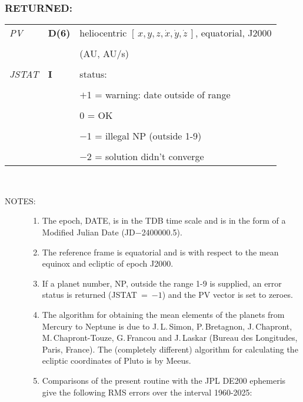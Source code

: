 \documentclass[11pt,twoside,nolof]{starlink}
\providecommand{\xyzxyzd}   {$[\,x,y,z,\dot{x},\dot{y},\dot{z}\,]$}
\newcommand{\args}[2]{
  \subsubsection*{#1:}
     \begin{tabular}{p{7em}p{6em}p{22em}}
       #2
     \end{tabular}\\
}
\newcommand{\spec}[3]
{
  \emph{{#1}} & {\textbf{\mbox{#2}}} & {#3} \\
}
\newcommand{\notes}[1]
 {
   \begin{description}
     \item[NOTES:]
         #1
   \end{description}
}
\begin{document}
\args{RETURNED}
{
 \spec{PV}{D(6)}{heliocentric \xyzxyzd, equatorial, J2000} \\
 \spec{}{}{\hspace{1.5em} (AU, AU/s)} \\
 \spec{JSTAT}{I}{status:} \\
 \spec{}{}{\hspace{1.5em} $+$1 = warning: date outside of range} \\
 \spec{}{}{\hspace{2.3em}    0 = OK} \\
 \spec{}{}{\hspace{1.5em} $-$1 = illegal NP (outside 1-9)} \\
 \spec{}{}{\hspace{1.5em} $-$2 = solution didn't converge}
}
\notes
{
 \begin{enumerate}
  \item The epoch, DATE, is in the TDB time scale and is in the form
        of a Modified Julian Date (JD$-$2400000.5).
  \item The reference frame is equatorial and is with respect to
        the mean equinox and ecliptic of epoch J2000.
  \item If a planet number, NP, outside the range 1-9 is supplied, an error
        status is returned (JSTAT~=~$-1$) and the PV vector
        is set to zeroes.
  \item The algorithm for obtaining the mean elements of the
        planets from Mercury to Neptune is due to
        J.\,L.\,Simon, P.\,Bretagnon, J.\,Chapront,
        M.\,Chapront-Touze, G.\,Francou and J.\,Laskar (Bureau des
        Longitudes, Paris, France).  The (completely different)
        algorithm for calculating the ecliptic coordinates of
        Pluto is by Meeus.
  \item Comparisons of the present routine with the JPL DE200 ephemeris
        give the following RMS errors over the interval 1960-2025:


\end{enumerate}}
\end{document}
